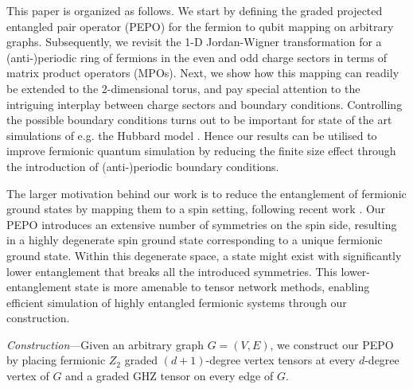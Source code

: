 \documentclass[aps,prl,twocolumn,floatfix,10pt,amssymb,amsfont,amsmath,superscriptaddress,float,nofootinbib,longbibliography,nobalancelastpage]{revtex4-2}
\begin{document}
This paper is organized as follows. We start by defining the graded projected entangled  pair operator (PEPO) for the fermion to qubit mapping on arbitrary graphs. Subsequently, we revisit the 1-D Jordan-Wigner transformation for a (anti-)periodic ring of fermions in the even and odd charge sectors in terms of matrix product operators (MPOs). Next, we show how this mapping can readily be extended to the 2-dimensional torus, and pay special attention to the intriguing interplay between charge sectors and boundary conditions. Controlling the possible boundary conditions turns out to be important for state of the art simulations of e.g. the Hubbard model \cite{xu2023coexistence}. Hence our results can be utilised to improve fermionic quantum simulation by reducing the finite size effect through the introduction of (anti-)periodic boundary conditions. 

The larger motivation behind our work is to reduce the entanglement of fermionic ground states by mapping them to a spin setting, following recent work \cite{Lootens:2024gfp}. Our PEPO introduces an extensive number of symmetries on the spin side, resulting in a highly degenerate spin ground state corresponding to a unique fermionic ground state. Within this degenerate space, a state might exist with significantly lower entanglement that breaks all the introduced symmetries. This lower-entanglement state is more amenable to tensor network methods, enabling efficient simulation of highly entangled fermionic systems through our construction.


\textit{Construction}---Given an arbitrary graph $G = (V,E)$, we construct our PEPO by placing  fermionic $Z_2$ graded  $(d+1)$-degree vertex tensors  \cite{Bultinck_2017} at every $d$-degree vertex of $G$ and a graded GHZ tensor on every edge of $G$.
\end{document}
